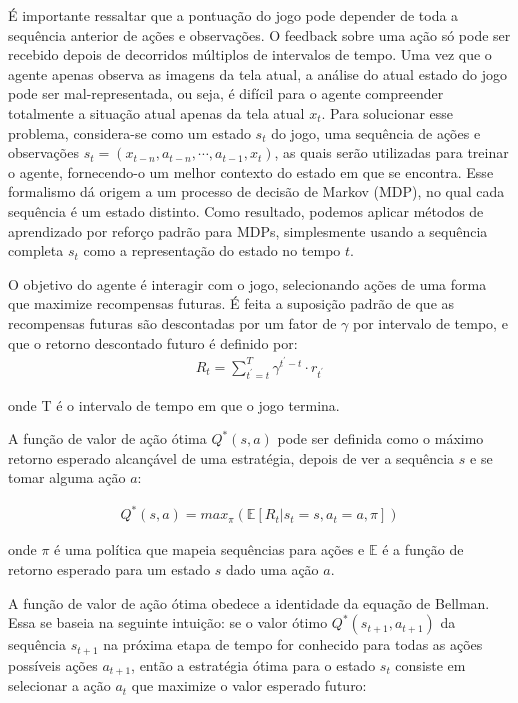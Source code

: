 É importante ressaltar que a pontuação do jogo pode depender de toda a sequência anterior de ações e observações. O feedback sobre uma ação só pode ser recebido depois de decorridos múltiplos de intervalos de tempo. Uma vez que o agente apenas observa as imagens da tela atual, a análise do atual estado do jogo pode ser mal-representada, ou seja, é difícil para o agente compreender totalmente a situação atual apenas da tela atual $x_t$. 
Para solucionar esse problema, considera-se como um estado $s_t$ do jogo, uma sequência de ações e observações $s_t = (x_{t-n},a_{t-n},\cdots,a_{t-1},x_t)$, as quais serão utilizadas para treinar o agente, fornecendo-o um melhor contexto do estado em que se encontra. Esse formalismo dá origem a um processo de decisão de Markov (MDP), no qual cada sequência é um estado distinto. Como resultado, podemos aplicar métodos de aprendizado por reforço padrão para MDPs, simplesmente usando a sequência completa $s_t$ como a representação do estado no tempo $t$.

O objetivo do agente é interagir com o jogo, selecionando ações de uma forma que maximize recompensas futuras. É feita a suposição padrão de que as recompensas futuras são descontadas por um fator de $\gamma$ por intervalo de tempo, e que o retorno descontado futuro é definido por: 
\begin{eqnarray}
	R_t=\sum_{t^{\prime}=t}^T \gamma^{t^{\prime}-t}\cdot r_{t^{\prime}}
\end{eqnarray}

onde T é o intervalo de tempo em que o jogo termina. 

A função de valor de ação ótima $Q^{*}(s, a)$ pode ser definida como o máximo retorno esperado alcançável de uma estratégia, depois de ver a sequência $s$ e se tomar alguma ação $a$:

\begin{eqnarray}
	Q^{*}(s, a)=max_\pi(\mathbb{E}[R_t | s_t=s,a_t=a,\pi])
\end{eqnarray}

onde $\pi$ é uma política que mapeia sequências para ações e $\mathbb{E}$ é a função de retorno esperado para um estado $s$ dado uma ação $a$.


A função de valor de ação ótima obedece a identidade da equação de Bellman. Essa se baseia na seguinte intuição: se o valor ótimo $Q^{*}(s_{t+1}, a_{t+1})$ da sequência $s_{t+1}$ na próxima etapa de tempo for conhecido para todas as ações possíveis ações $a_{t+1}$, então a estratégia ótima para o estado $s_t$ consiste em selecionar a ação $a_{t}$ que maximize o valor esperado futuro:

